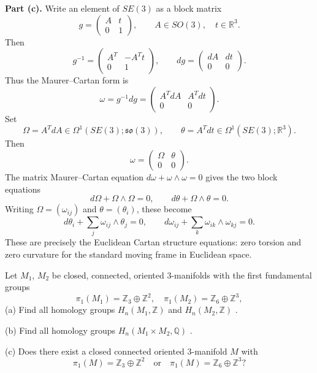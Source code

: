 \begin{solution}
\textbf{Part (c).}
Write an element of $SE(3)$ as a block matrix
\[
    g=
    \begin{pmatrix}
        A & t\\
        0 & 1
    \end{pmatrix},
    \qquad A\in SO(3),\quad t\in\mathbb{R}^3.
\]
Then
\[
    g^{-1}=
    \begin{pmatrix}
        A^T & -A^Tt\\
        0 & 1
    \end{pmatrix},
    \qquad
    dg=
    \begin{pmatrix}
        dA & dt\\
        0 & 0
    \end{pmatrix}.
\]
Thus the Maurer--Cartan form is
\[
    \omega=g^{-1}dg
    =
    \begin{pmatrix}
        A^TdA & A^Tdt\\
        0 & 0
    \end{pmatrix}.
\]
Set
\[
    \Omega=A^TdA\in\Omega^1(SE(3);\mathfrak{so}(3)),
    \qquad
    \theta=A^Tdt\in\Omega^1(SE(3);\mathbb{R}^3).
\]
Then
\[
    \omega=
    \begin{pmatrix}
        \Omega & \theta\\
        0 & 0
    \end{pmatrix}.
\]
The matrix Maurer--Cartan equation $d\omega+\omega\wedge\omega=0$ gives the two
block equations
\[
    d\Omega+\Omega\wedge\Omega=0,
    \qquad
    d\theta+\Omega\wedge\theta=0.
\]
Writing $\Omega=(\omega_{ij})$ and $\theta=(\theta_i)$, these become
\[
    d\theta_i+\sum_j\omega_{ij}\wedge\theta_j=0,
    \qquad
    d\omega_{ij}+\sum_k\omega_{ik}\wedge\omega_{kj}=0.
\]
These are precisely the Euclidean Cartan structure equations: zero torsion and
zero curvature for the standard moving frame in Euclidean space.
\end{solution}

\begin{exercise}
\label{geometry:2023:2}
Let $M_1$, $M_2$ be closed, connected, oriented 3-manifolds with the first fundamental groups
$$
\pi_ {1} (M _ {1}) = \mathbb {Z} _ {3} \oplus \mathbb {Z} ^ {2}, \quad \pi_ {1} (M _ {2}) = \mathbb {Z} _ {6} \oplus \mathbb {Z} ^ {3},
$$
(a) Find all homology groups $H _ { n } ( M _ { 1 } , \mathbb { Z } )$ and $H _ { n } ( M _ { 2 } , \mathbb { Z } )$ .

(b) Find all homology groups $H _ { n } ( M _ { 1 } \times M _ { 2 } , \mathbb { Q } )$ .

(c) Does there exist a closed connected oriented 3-manifold $M$ with
$$
\pi_ {1} (M) = \mathbb {Z} _ {3} \oplus \mathbb {Z} ^ {2} \quad \mathrm {o r} \quad \pi_ {1} (M) = \mathbb {Z} _ {6} \oplus \mathbb {Z} ^ {3}?
$$
\end{exercise}

